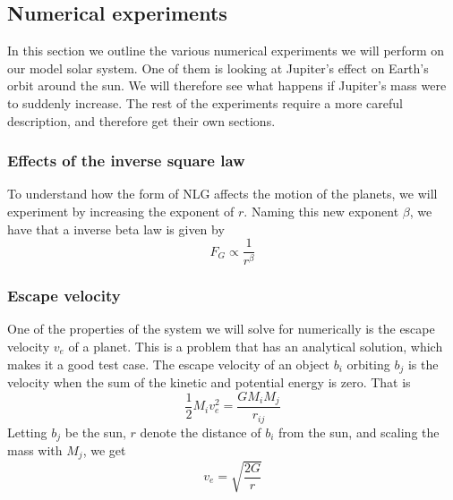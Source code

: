 \subsection{Numerical experiments}
\label{sec:numex}
In this section we outline the various numerical experiments we will perform on our
model solar system. One of them is looking at Jupiter's effect on Earth's orbit around the sun.
We will therefore see what happens if Jupiter's mass were to suddenly increase. The rest
of the experiments require a more careful description, and therefore get their own sections.
\subsubsection{Effects of the inverse square law}
\label{sec:beta}
	To understand how the form of NLG affects the motion of the planets, we will
	experiment by increasing the exponent of $r$. Naming this new exponent $\beta$,
	we have that a inverse beta law is given by
	\begin{equation}
		\label{eq:beta}
			F_G \propto \frac{1}{r^\beta}
	\end{equation}

\subsubsection{Escape velocity}
\label{sec:escvel}
One of the properties of the system we will solve for numerically is the escape velocity $v_e$ of a planet. This is a problem that has an analytical solution, which makes it a good test case. The escape velocity of an object $b_i$ orbiting $b_j$ is the velocity when the sum of the kinetic and potential energy is zero. That is
\begin{equation}
	\frac{1}{2}M_iv_e^2 = \frac{GM_iM_j}{r_{ij}}
\end{equation}
Letting $b_j$ be the sun, $r$ denote the distance of $b_i$ from the sun, and scaling the mass with $M_j$, we get
\begin{equation}
	\label{eq:esc}
	v_e = \sqrt{\frac{2G}{r}}
\end{equation}

